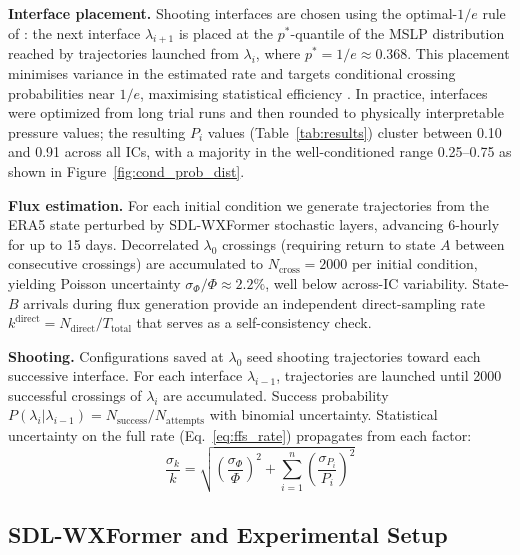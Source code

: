 \documentclass[11pt]{article}
\begin{document}
\textbf{Interface placement.}
Shooting interfaces are chosen using the optimal-$1/e$ rule of
\citet{allen2009forward}: the next interface $\lambda_{i+1}$ is placed at the
$p^*$-quantile of the MSLP distribution reached by trajectories launched from
$\lambda_i$, where $p^* = 1/e \approx 0.368$.  This placement minimises variance in
the estimated rate and targets conditional crossing probabilities near $1/e$,
maximising statistical efficiency \citep{allen2009forward}.
In practice, interfaces were optimized from long trial runs and then rounded to
physically interpretable pressure values; the resulting $P_i$ values (Table~\ref{tab:results})
cluster between 0.10 and 0.91 across all ICs, with a majority in the well-conditioned
range 0.25--0.75 as shown in Figure~\ref{fig:cond_prob_dist}.

\textbf{Flux estimation.}
For each initial condition we generate trajectories from the ERA5 state perturbed by
SDL-WXFormer stochastic layers, advancing 6-hourly for up to 15 days. Decorrelated
$\lambda_0$ crossings (requiring return to state $A$ between consecutive crossings) are
accumulated to $N_{\text{cross}} = 2000$ per initial condition, yielding Poisson
uncertainty $\sigma_\Phi/\Phi \approx 2.2\%$, well below across-IC variability.
State-$B$ arrivals during flux generation provide an independent direct-sampling rate
$k^{\text{direct}} = N_{\text{direct}}/T_{\text{total}}$ that serves as a self-consistency check.

\textbf{Shooting.}
Configurations saved at $\lambda_0$ seed shooting trajectories toward each successive
interface. For each interface $\lambda_{i-1}$, trajectories are launched until 2000
successful crossings of $\lambda_i$ are accumulated. Success probability
$P(\lambda_i|\lambda_{i-1}) = N_{\text{success}}/N_{\text{attempts}}$ with binomial
uncertainty. Statistical uncertainty on the full rate (Eq.~\ref{eq:ffs_rate}) propagates
from each factor:
\begin{equation}
\frac{\sigma_k}{k} = \sqrt{\left(\frac{\sigma_\Phi}{\Phi}\right)^2 + \sum_{i=1}^{n}\left(\frac{\sigma_{P_i}}{P_i}\right)^2}
\end{equation}

\subsection{SDL-WXFormer and Experimental Setup}
\end{document}
